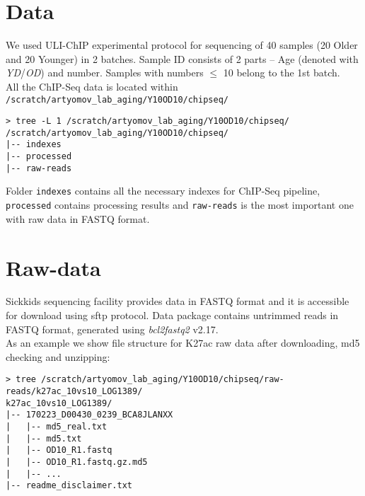 \documentclass{article}
\begin{document}
\section{Data}
We used ULI-ChIP experimental protocol for sequencing of 40 samples (20 Older and 20 Younger) in 2 batches. 
Sample ID consists of 2 parts – Age (denoted with \textit{YD}/\textit{OD}) and number. Samples with numbers $\leq$ 10 belong to the 1st batch.\\
All the ChIP-Seq data is located within \texttt{/scratch/artyomov\_lab\_aging/Y10OD10/chipseq/}
\begin{lstlisting}
> tree -L 1 /scratch/artyomov_lab_aging/Y10OD10/chipseq/
/scratch/artyomov_lab_aging/Y10OD10/chipseq/
|-- indexes
|-- processed
|-- raw-reads 
\end{lstlisting}
Folder \texttt{indexes} contains all the necessary indexes for ChIP-Seq pipeline, \texttt{processed} contains processing results and \texttt{raw-reads} is the most important one with raw data in FASTQ format.

\section{Raw-data}
Sickkids sequencing facility provides data in FASTQ format and it is accessible for download using sftp protocol. Data package contains untrimmed reads in FASTQ format, generated using \textit{bcl2fastq2} v2.17.\\
As an example we show file structure for K27ac raw data after downloading, md5 checking and unzipping:
\begin{lstlisting}
> tree /scratch/artyomov_lab_aging/Y10OD10/chipseq/raw-reads/k27ac_10vs10_LOG1389/
k27ac_10vs10_LOG1389/
|-- 170223_D00430_0239_BCA8JLANXX
|	|-- md5_real.txt
|	|-- md5.txt
|	|-- OD10_R1.fastq
|	|-- OD10_R1.fastq.gz.md5
|	|-- ...
|-- readme_disclaimer.txt
\end{lstlisting}
\end{document}
